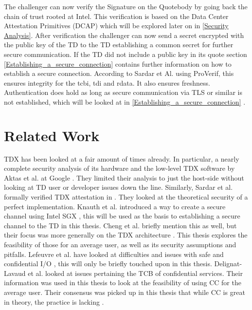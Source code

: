 The challenger can now verify the Signature on the Quotebody by going back the chain of trust rooted at Intel. This verification is based on the Data Center Attestation Primitives (DCAP) which will be explored later on in \cref{Security Analysis}. After verification the challenger can now send a secret encrypted with the public key of the TD to the TD establishing a common secret for further secure communication. If the TD did not include a public key in its quote section \cref{Establishing_a_secure_connection} contains further information on how to establish a secure connection. According to Sardar et Al. using ProVerif, this ensures integrity for the tcbi, tdi and rdata. It also ensures freshness. Authentication does hold as long as secure communication via TLS or similar is not established, which will be looked at in \cref{Establishing_a_secure_connection} \cite{sardar_formal_2023}.

\section{Related Work}
TDX has been looked at a fair amount of times already. In particular, a nearly complete security analysis of its hardware and the low-level TDX software by Aktas et al. at Google \cite{aktas_intel_nodate}. They limited their analysis to just the host-side without looking at TD user or developer issues down the line. Similarly, Sardar et al. formally verified TDX attestation in \cite{sardar_demystifying_2021}. They looked at the theoretical security of a perfect implementation. Knauth et al. introduced a way to create a secure channel using Intel \Gls{SGX} \cite{knauth_integrating_2019}, this will be used as the basis to establishing a secure channel to the TD in this thesis. Cheng et al. briefly mention this as well, but their focus was more generally on the TDX architecture \cite{cheng_intel_2023}. This thesis explores the feasibility of those for an average user, as well as its security assumptions and pitfalls. Lefeuvre et al. have looked at difficulties and issues with safe and confidential I/O \cite{lefeuvre_towards_2023}, this will only be briefly touched upon in this thesis. Delignat-Lavaud et al. looked at issues pertaining the TCB of confidential services. Their information was used in this thesis to look at the feasibility of using CC for the average user. Their consensus was picked up in this thesis that while CC is great in theory, the practice is lacking \cite{delignat-lavaud_why_2023}.

